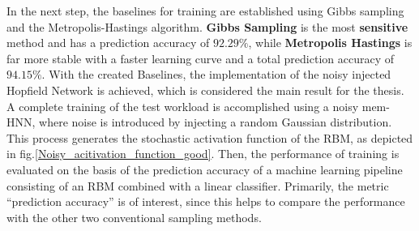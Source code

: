 In the next step, the baselines for training are established using Gibbs sampling and the Metropolis-Hastings algorithm.
\textbf{Gibbs Sampling} is the most \textbf{sensitive} method and has a prediction accuracy of \(\mathbf{92.29\%}\), while
\textbf{Metropolis Hastings} is far more stable with a faster learning curve and a total prediction accuracy of \(\mathbf{94.15\%}\).
With the created Baselines, the implementation of the noisy injected Hopfield Network is achieved, which is considered the main result for the thesis. 
A complete training of the test workload is accomplished using a noisy \ac{mem-HNN}, where noise is introduced by injecting a random Gaussian distribution.
This process generates the stochastic activation function of the \ac{RBM}, as depicted in fig.\ref{Noisy_acitivation_function_good}.
Then, the performance of training is evaluated on the basis of the prediction accuracy of a machine learning pipeline consisting of an \ac{RBM} combined with a linear classifier.
Primarily, the metric ``prediction accuracy'' is of interest, since this helps to compare the performance with the other two conventional sampling methods.

